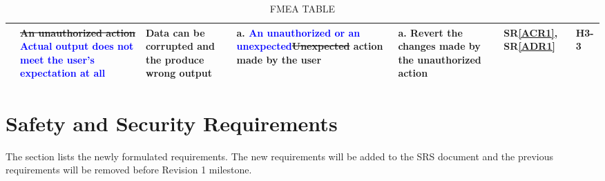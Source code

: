 \documentclass{article}
\begin{document}
\begin{landscape}
\begin{table}[H]
{\begin{tabular}{|p{1.8 in}|p{2.0 in}|p{2 in}|p{2 in}|p{2.3 in}|p{0.5 in}|p{0.5 in}|}
& \sout{An unauthorized action} \textcolor{blue}{Actual output does not meet the user's expectation at all}
& Data can be corrupted and the produce wrong output 
&
a. \textcolor{blue}{An unauthorized or an unexpected}\sout{Unexpected} action made by the user\newline
& 
a. Revert the changes made by the unauthorized action\newline
& SR\ref{ACR1}, SR\ref{ADR1}
& H3-3 \\ \hline



 

\end{tabular}
}
\caption{FMEA TABLE}
\label{Table:FMEA TABLE}
\end{table}
\end{landscape}


\section{Safety and Security Requirements}
The section lists the newly formulated requirements. The new requirements will be added to the SRS document and the previous requirements will be removed before Revision 1 milestone.
\end{document}
